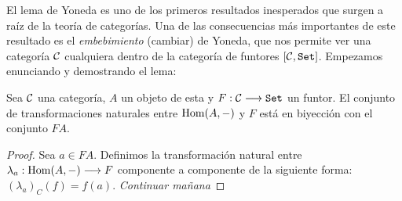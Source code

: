El lema de Yoneda es uno de los primeros resultados
inesperados que surgen a raíz de la teoría de categorías. Una
de las consecuencias más importantes de este resultado es
el \textit{embebimiento} (cambiar) de Yoneda, que nos permite
ver una categoría $\mathcal{C}$ cualquiera dentro de la categoría de
funtores $[\mathcal{C}, \texttt{Set}]$. Empezamos enunciando y demostrando el lema:

\begin{theorem}
  Sea $\mathcal{C}$ una categoría, $A$ un objeto de esta
  y $F : \mathcal{C}\longrightarrow \texttt{Set}$ un funtor. El conjunto de transformaciones
  naturales entre $\operatorname{Hom}(A, -)$ y $F$ está en biyección con el
  conjunto $F A$.
\end{theorem}
\begin{proof}
  Sea $a \in F A$. Definimos la transformación natural entre
  $\lambda_a : \operatorname{Hom}(A, -)\longrightarrow F$ componente a componente de
  la siguiente forma: $(\lambda_a)_C(f) = f(a)$.
  \textit{Continuar mañana}
\end{proof}

